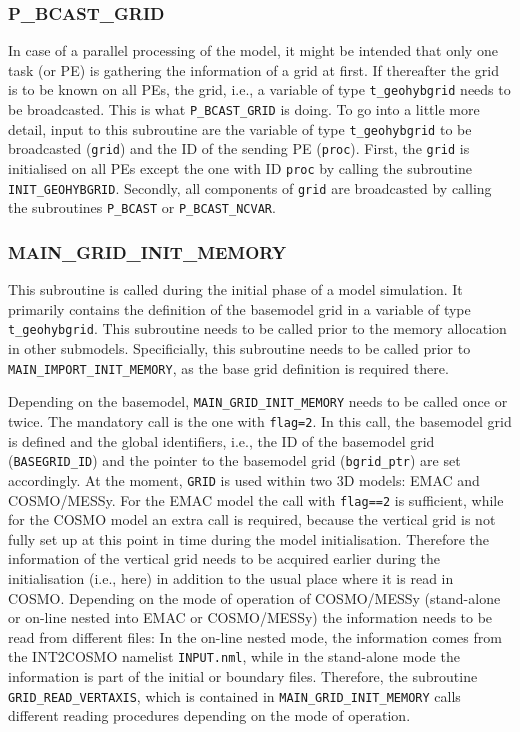 \documentclass[11pt,twoside]{article}
\begin{document}
\subsubsection{P\_BCAST\_GRID\label{PBCGRID}}
In case of a parallel processing of the model, it might be intended that
only one task (or PE) is gathering the information of a grid at
first. If thereafter the 
grid is to be known on all PEs, the grid, i.e., a variable of type
\verb|t_geohybgrid| needs to be broadcasted. This is
what \verb|P_BCAST_GRID| 
is doing. To go into a little more detail, input to this subroutine are the
variable of type \verb|t_geohybgrid| to be broadcasted (\verb|grid|) and the
ID of the sending PE (\verb|proc|).
First, the \verb|grid| is initialised on all PEs except the one with
ID \verb|proc| by calling the subroutine \verb|INIT_GEOHYBGRID|. Secondly,  
all components of \verb|grid| are broadcasted by calling the subroutines 
\verb|P_BCAST| or \verb|P_BCAST_NCVAR|.

\subsubsection{MAIN\_GRID\_INIT\_MEMORY\label{MGIM}}
This subroutine is called during the initial phase of a model simulation. 
It primarily contains the definition of the basemodel grid in a variable of
type \verb|t_geohybgrid|. This subroutine needs to be called 
prior to the memory allocation in other submodels. Specificially, this
subroutine  needs to be called prior to \verb|MAIN_IMPORT_INIT_MEMORY|,
as the base grid definition is required there.

Depending on the basemodel, \verb|MAIN_GRID_INIT_MEMORY| needs to be called
once or twice. The mandatory call is the one with \verb|flag=2|. In
this call, the 
basemodel grid is defined and the global identifiers, i.e., the ID of the
basemodel grid (\verb|BASEGRID_ID|) and the pointer to the basemodel grid
(\verb|bgrid_ptr|) are set accordingly.
At the moment, \verb|GRID| is used within two 3D models: 
EMAC and COSMO/MESSy. For the EMAC model the call with \verb|flag==2| is
sufficient, while for the COSMO model an extra call is required, because the
vertical grid is not fully set up at this point in time during the model
initialisation. Therefore the information of the vertical grid needs to be
acquired earlier during the initialisation (i.e., here) in addition to
the usual place where it is read in COSMO. 
Depending on the mode of operation of COSMO/MESSy (stand-alone or
on-line nested into EMAC or COSMO/MESSy) the 
information needs to be read from different files: In the on-line nested
mode, the information comes from the  INT2COSMO
namelist \verb|INPUT.nml|, while in the stand-alone 
mode the information is part of the initial or boundary files.
Therefore, the subroutine \verb|GRID_READ_VERTAXIS|, which is contained in
\verb|MAIN_GRID_INIT_MEMORY| calls different reading procedures depending on
the mode of operation.
\end{document}
